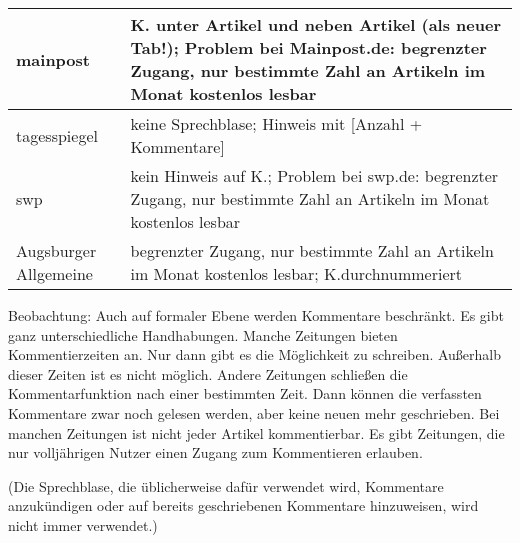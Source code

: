 \begin{landscape}
\begin{longtable}{l|p{170mm}}
mainpost		& K. unter Artikel und neben Artikel (als neuer Tab!); Problem bei Mainpost.de: begrenzter Zugang, nur bestimmte Zahl an Artikeln im Monat kostenlos lesbar\\\hline
tagesspiegel		& keine Sprechblase; Hinweis mit [Anzahl + Kommentare]\\\hline
swp			& kein Hinweis auf K.; Problem bei swp.de: begrenzter Zugang, nur bestimmte Zahl an Artikeln im Monat kostenlos lesbar\\\hline
Augsburger Allgemeine	& begrenzter Zugang, nur bestimmte Zahl an Artikeln im Monat kostenlos lesbar; K.durchnummeriert
\\ \hline               

\end{longtable}
\end{landscape}

Beobachtung:
Auch auf formaler Ebene werden Kommentare beschränkt. Es gibt ganz unterschiedliche Handhabungen. Manche Zeitungen bieten Kommentierzeiten an. Nur dann gibt es die Möglichkeit zu schreiben. Außerhalb dieser Zeiten ist es nicht möglich. Andere Zeitungen schließen die Kommentarfunktion nach einer bestimmten Zeit. Dann können die verfassten Kommentare zwar noch gelesen werden, aber keine neuen mehr geschrieben. Bei manchen Zeitungen ist nicht jeder Artikel kommentierbar. Es gibt Zeitungen, die nur volljährigen Nutzer einen Zugang zum Kommentieren erlauben. 


(Die Sprechblase, die üblicherweise dafür verwendet wird, Kommentare anzukündigen oder auf bereits geschriebenen Kommentare hinzuweisen, wird nicht immer verwendet.)

